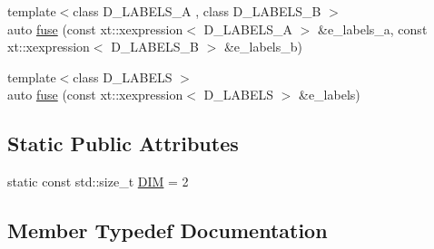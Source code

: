 \begin{DoxyCompactItemize}
\item 
{\footnotesize template$<$class D\+\_\+\+L\+A\+B\+E\+L\+S\+\_\+A , class D\+\_\+\+L\+A\+B\+E\+L\+S\+\_\+B $>$ }\\auto \hyperlink{classnifty_1_1graph_1_1opt_1_1lifted__multicut_1_1PixelWiseLmcConnetedComponentsFusion_3_012_01_4_a474eb36f28a8e5053b8779f03524a74e}{fuse} (const xt\+::xexpression$<$ D\+\_\+\+L\+A\+B\+E\+L\+S\+\_\+A $>$ \&e\+\_\+labels\+\_\+a, const xt\+::xexpression$<$ D\+\_\+\+L\+A\+B\+E\+L\+S\+\_\+B $>$ \&e\+\_\+labels\+\_\+b)
\item 
{\footnotesize template$<$class D\+\_\+\+L\+A\+B\+E\+LS $>$ }\\auto \hyperlink{classnifty_1_1graph_1_1opt_1_1lifted__multicut_1_1PixelWiseLmcConnetedComponentsFusion_3_012_01_4_af4cb1b970e31478a1a9d608dc0433ba6}{fuse} (const xt\+::xexpression$<$ D\+\_\+\+L\+A\+B\+E\+LS $>$ \&e\+\_\+labels)
\end{DoxyCompactItemize}
\subsection*{Static Public Attributes}
\begin{DoxyCompactItemize}
\item 
static const std\+::size\+\_\+t \hyperlink{classnifty_1_1graph_1_1opt_1_1lifted__multicut_1_1PixelWiseLmcConnetedComponentsFusion_3_012_01_4_aa53357c01823259e7ac1216f1211a531}{D\+IM} = 2
\end{DoxyCompactItemize}


\subsection{Member Typedef Documentation}
\mbox{\label{classnifty_1_1graph_1_1opt_1_1lifted__multicut_1_1PixelWiseLmcConnetedComponentsFusion_3_012_01_4_a4db4caca2bad22f2dff0390dac8dc501}} 
